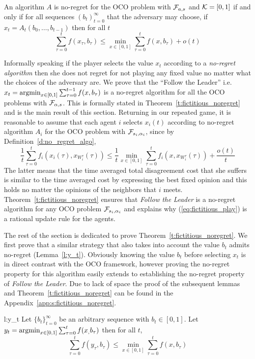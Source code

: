 \begin{definition}\label{d:no_regret_algo}
An algorithm $A$ is no-regret for the OCO problem with $\mathcal{F}_{a,s}$ and
$\mathcal{K}=[0,1]$ if and only if for all sequences $(b_t)_{t=0}^\infty$ that the
adversary may choose, if $x_t = A_t(b_0,\dots,b_{t-1})$ then for all $t$
\[\sum_{\tau=0}^t f(x_\tau,b_\tau)  \leq \min_{x \in [0,1]}\sum_{\tau=0}^t f(x,b_\tau) + o(t) \]
\end{definition}
Informally speaking if the player selects the value
$x_t$ according to a \emph{no-regret algorithm} then
she does not regret for not playing any fixed value no
matter what the choices of the adversary are.
We prove that the \enquote{Follow the Leader} i.e.
$x_t = \operatorname*{argmin}_{x \in [0,1]}\sum_{\tau=0}^{t-1}f(x,b_\tau)$
is a no-regret algorithm for all the OCO problems with $\mathcal{F}_{\alpha,s}$.
This is formally stated in Theorem~\ref{t:fictitious_noregret}
and is the main result of this section.
Returning in our repeated game, it is reasonable to
assume that each agent $i$ selects $x_i(t)$ according
to no-regret algorithm $A_i$ for the OCO problem with $\mathcal{F}_{s_i,\alpha_i}$,
since by Definition~\ref{d:no_regret_algo},
\[\frac{1}{t}\sum_{\tau=0}^t f_i(x_i(\tau),x_{W_i^\tau}(\tau)) \leq
\frac{1}{t}\min_{x \in [0,1]}\sum_{\tau=0}^tf_i(x,x_{W_i^\tau}(\tau)) + \frac{o(t)}{t}\]
The latter means that the time averaged total disagreement cost
that she suffers is similar to the time averaged cost by expressing the
best fixed opinion and this holds no matter the opinions of the
neighbors that $i$ meets. Theorem~\ref{t:fictitious_noregret}
ensures that \emph{Follow the Leader} is a no-regret algorithm
for any OCO problem $\mathcal{F}_{s_i,\alpha_i}$ and explains why
(\ref{eq:fictitious_play}) is a rational update rule for the agents.

The rest of the section is dedicated to prove Theorem~\ref{t:fictitious_noregret}.
We first prove that a similar strategy that also takes into
account the value $b_t$ admits no-regret (Lemma~\ref{l:y_t}).
Obviously knowing the value $b_t$ before selecting $x_t$
is in direct contrast with the OCO framework, however proving
the no-regret property for this algorithm easily extends to
establishing the no-regret property of \emph{Follow the Leader}.
Due to lack of space the proof of the subsequent lemmas and
Theorem~\ref{t:fictitious_noregret} can be found in the
Appendix~\ref{app:s:fictitious_noregret}.

\begin{replemma}{l:y_t}
Let $\{b_t\}_{t=0}^\infty$ be an arbitrary sequence with $b_t \in [0,1]$.
Let $y_t = \operatorname*{argmin}_{x \in [0,1]}\sum_{\tau=0}^tf(x_,b_\tau)$
then for all $t$,
\[
\sum_{\tau=0}^t f(y_\tau,b_\tau) \leq \min_{x \in [0,1]}\sum_{\tau = 0}^tf(x,b_\tau)
\]
\end{replemma}

